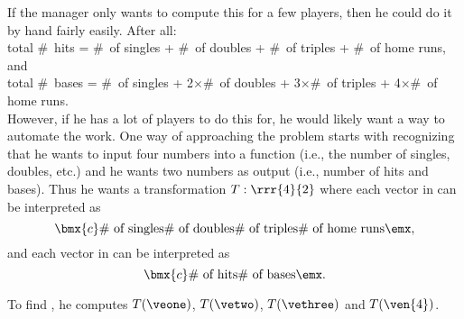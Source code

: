 {If the manager only wants to compute this for a few players, then he could do it by hand fairly easily. After all: \\


\noindent total \#\ hits = \#\ of singles + \#\ of doubles + \#\ of triples + \#\ of home runs,\\

and \\

\noindent total \#\ bases = \#\ of singles + 2$\times$\#\ of doubles + 3$\times$\#\ of triples + 4$\times$\#\ of home runs.\\

However, if he has a lot of players to do this for, he would likely want a way to automate the work.  One way of approaching the problem starts with recognizing that he wants to input four numbers into a function (i.e., the number of singles, doubles, etc.) and he wants two numbers as output (i.e., number of hits and bases). Thus he wants a transformation $T:\rrr{4}{2}$ where each vector in  can be interpreted as 
\[
\bmx{c} \text{\#\ of singles} \\\text{\#\ of doubles} \\ \text{\#\ of triples} \\ \text{\#\ of home runs} \emx,
\]
and each vector in  can be interpreted as 
\[
\bmx{c} \text{\#\ of hits} \\\text{\#\ of bases} \emx.
\]


To find \TT, he computes $T(\veone)$, $T(\vetwo)$, $T(\vethree)$ and $T(\ven{4})$.\\

}
